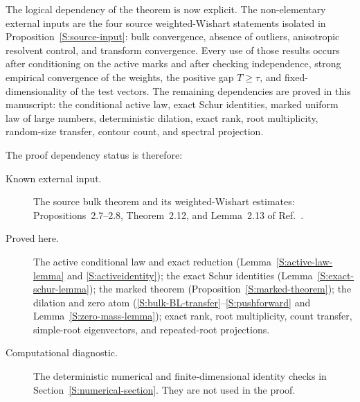 The logical dependency of the theorem is now explicit. The non-elementary
external inputs are the four source weighted-Wishart statements isolated in
Proposition~\ref{S:source-input}: bulk convergence, absence of outliers,
anisotropic resolvent control, and transform convergence. Every use of those
results occurs
after conditioning on the active marks and after checking independence,
strong empirical convergence of the weights, the positive gap $T\ge\tau$,
and fixed-dimensionality of the test vectors. The remaining dependencies are
proved in this manuscript: the conditional active law, exact Schur identities,
marked uniform law of large numbers, deterministic dilation, exact rank,
root multiplicity, random-size transfer, contour count, and spectral projection.

The proof dependency status is therefore:
\begin{description}
\item[Known external input.] The source bulk theorem and its
weighted-Wishart estimates: Propositions~2.7--2.8, Theorem~2.12, and
Lemma~2.13 of Ref.~\cite{BenArousEtAl2025}.
\item[Proved here.] The active conditional law and exact reduction
(Lemma~\ref{S:active-law-lemma} and \eqref{S:activeidentity}); the exact
Schur identities (Lemma~\ref{S:exact-schur-lemma}); the marked theorem
(Proposition~\ref{S:marked-theorem}); the dilation and zero atom
(\eqref{S:bulk-BL-transfer}--\eqref{S:pushforward} and
Lemma~\ref{S:zero-mass-lemma}); exact rank, root multiplicity, count
transfer, simple-root eigenvectors, and repeated-root projections.
\item[Computational diagnostic.] The deterministic numerical and
finite-dimensional identity checks in Section~\ref*{S:numerical-section}.  They are not used in
the proof.
\end{description}

